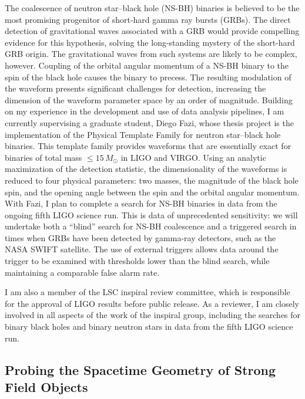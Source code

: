 The coalescence of neutron star--black hole (NS-BH) binaries is believed to be
the most promising progenitor of short-hard gamma ray bursts
(GRBs)\cite{Fox:2005kv}.  The direct detection of gravitational waves
associated with a GRB would provide compelling evidence for this hypothesis,
solving the long-standing mystery of the short-hard GRB origin. The
gravitational waves from such systems are likely to be complex, however.
Coupling of the orbital angular momentum of a NS-BH binary to the spin of the
black hole causes the binary to precess. The resulting modulation of the
waveform presents significant challenges for detection, increasing the
dimension of the waveform parameter space by an order of magnitude. Building
on my experience in the development and use of data analysis pipelines, I am
currently supervising a graduate student, Diego Fazi, whose thesis project is
the implementation of the Physical Template Family for neutron star--black
hole binaries\cite{Pan:2003qt}. This template family provides waveforms that
are essentially exact for binaries of total mass $\le 15\,M_\odot$ in LIGO and
VIRGO. Using an analytic maximization of the detection statistic, the
dimensionality of the waveforms is reduced to four physical parameters: two
masses, the magnitude of the black hole spin, and the opening angle between
the spin and the orbital angular momentum. With Fazi, I plan to complete a
search for NS-BH binaries in data from the ongoing fifth LIGO science run.
This is data of unprecedented sensitivity: we will undertake both a ``blind''
search for NS-BH coalescence and a triggered search in times when GRBs have
been detected by gamma-ray detectors, such as the NASA SWIFT satellite. The use
of external triggers allows data around the trigger to be examined with
thresholds lower than the blind search, while maintaining a comparable false
alarm rate.

I am also a member of the LSC inspiral review committee, which is responsible
for the approval of LIGO results before public release. As a reviewer, I am
closely involved in all aspects of the work of the inspiral group, including
the searches for binary black holes and binary neutron stars in data from the
fifth LIGO science run.

\subsection{Probing the Spacetime Geometry of Strong Field Objects}

